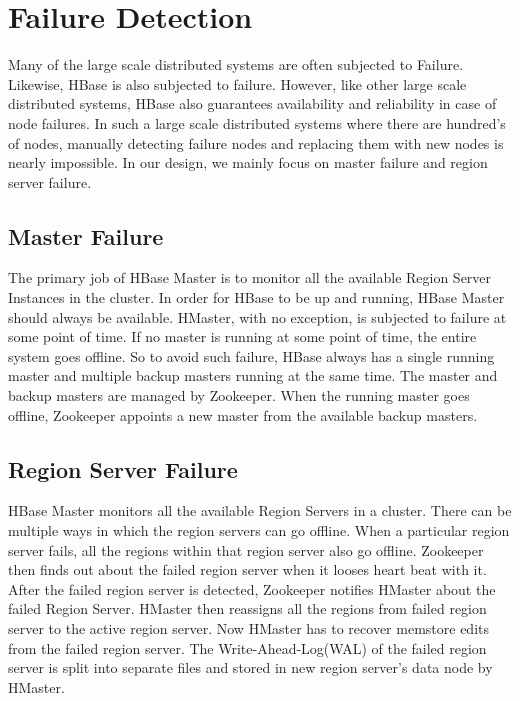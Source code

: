 \documentclass[11pt,a4paper,bibtotoc,idxtotoc,headsepline,footsepline,footexclude,BCOR12mm,DIV13]{scrbook}
\begin{document}
\chapter{Failure Detection}
\label{Failure Detection}
Many of the large scale distributed systems are often subjected to Failure. Likewise, HBase is also subjected to failure. However, like other large scale distributed systems, HBase also guarantees availability and reliability in case of node failures. In such a large scale distributed systems where there are hundred's of nodes, manually detecting failure nodes and replacing them with new nodes is nearly impossible. In our design, we mainly focus on master failure and region server failure.

\section{Master Failure}
\label{Master Failure}
The primary job of HBase Master is to monitor all the available Region Server Instances in the cluster. In order for HBase to be up and running, HBase Master should always be available. HMaster, with no exception, is subjected to failure at some point of time. If no master is running at some point of time, the entire system goes offline. So to avoid such failure, HBase always has a single running master and multiple backup masters running at the same time. The master and backup masters are managed by Zookeeper. When the running master goes offline, Zookeeper appoints a new master from the available backup masters.

\section{Region Server Failure}
\label{Region Server Failure}
HBase Master monitors all the available Region Servers in a cluster. There can be multiple ways in which the region servers can go offline. When a particular region server fails, all the regions within that region server also go offline. Zookeeper then finds out about the failed region server when it looses heart beat with it. After the failed region server is detected, Zookeeper notifies HMaster about the failed Region Server. HMaster then reassigns all the regions from failed region server to the active region server. Now HMaster has to recover memstore edits from the failed region server. The Write-Ahead-Log(WAL) of the failed region server is split into separate files and stored in new region server's data node by HMaster.
\end{document}
